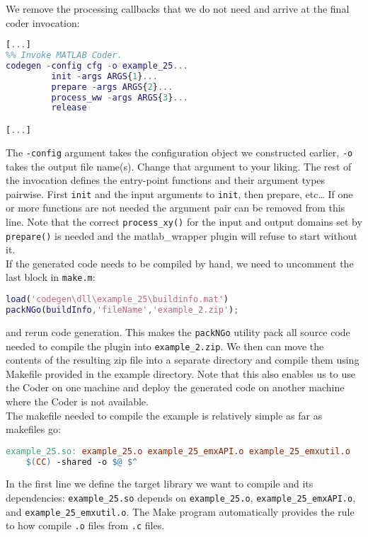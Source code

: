 \documentclass[11pt,a4paper,twoside]{article}
\newcommand{\+}{\discretionary{\mbox{\scriptsize$\hookleftarrow$}}{}{}}
\begin{document}
We remove the processing
callbacks that we do not need and arrive at the final coder invocation:
\begin{lstlisting}[language=Matlab]
[...]
%% Invoke MATLAB Coder.
codegen -config cfg -o example_25... 
         init -args ARGS{1}...
         prepare -args ARGS{2}...
         process_ww -args ARGS{3}...
         release

[...]
\end{lstlisting}
The \texttt{-config} argument takes the configuration object we constructed
earlier, \texttt{-o} takes the output file name(s). Change that argument to your liking.
The rest of the invocation defines the entry-point functions and their argument
types pairwise. First \texttt{init} and the input arguments to \texttt{init},
then prepare, etc\ldots
If one or more functions are not needed the argument pair can be removed from
this line. Note that the correct \texttt{process\_xy()} for the input and output
domains set by \texttt{prepare()} is needed and the matlab\_wrapper
plugin will refuse to start without it. \\
If the generated code needs to be compiled by hand, we need to uncomment the
last block in \texttt{make.m}:
\begin{lstlisting}[language=Matlab]
%% Optionally package the code for deployment elsewhere
load('codegen\dll\example_25\buildinfo.mat')
packNGo(buildInfo,'fileName','example_2.zip');
\end{lstlisting}
and rerun code generation. This makes the \texttt{packNGo} utility pack all
source code needed to compile the plugin into \texttt{example\_2.zip}.
We then can move the contents of the resulting zip file into a separate
directory and compile them using Makefile provided in the example directory.
Note that this also enables us to use the \Matlab{} Coder on one machine and deploy
the generated code on another machine where the Coder is not available. \\
The makefile needed to compile the example is relatively simple as far as
makefiles go:
\begin{lstlisting}[language=make]
example_25.so: example_25.o example_25_emxAPI.o example_25_emxutil.o
    $(CC) -shared -o $@ $^
\end{lstlisting}
In the first line we define the target library we want to compile and its dependencies:
\texttt{example\_25.so} depends on \texttt{example\_25.o}, \texttt{example\_25\_emxAPI.o}, 
and \texttt{example\_25\_emxutil.o}. The Make program automatically provides the rule 
to how compile \texttt{.o} files from \texttt{.c} files.
\end{document}
